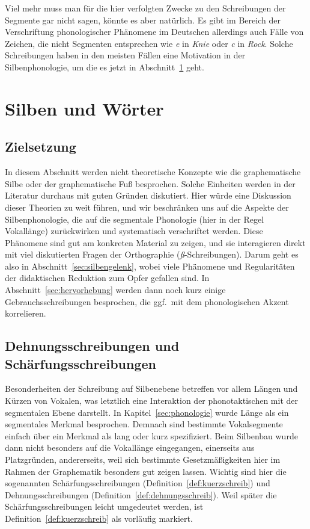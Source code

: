 Viel mehr muss man für die hier verfolgten Zwecke zu den Schreibungen der Segmente gar nicht sagen, könnte es aber natürlich.
Es gibt im Bereich der Verschriftung phonologischer Phänomene im Deutschen allerdings auch Fälle von Zeichen, die nicht Segmenten entsprechen wie \textit{e} in \textit{Knie} oder \textit{c} in \textit{Rock}.
Solche Schreibungen haben in den meisten Fällen eine Motivation in der Silbenphonologie, um die es jetzt in Abschnitt~\ref{sec:silbenschreib} geht.

\section{Silben und Wörter}

\label{sec:silbenschreib}

\subsection{Zielsetzung}

In diesem Abschnitt werden nicht theoretische Konzepte wie die graphematische Silbe oder der graphematische Fuß besprochen.
Solche Einheiten werden in der Literatur durchaus mit guten Gründen diskutiert.
Hier würde eine Diskussion dieser Theorien zu weit führen, und wir beschränken uns auf die Aspekte der Silbenphonologie, die auf die segmentale Phonologie (hier in der Regel Vokallänge) zurückwirken und systematisch verschriftet werden.
Diese Phänomene sind gut am konkreten Material zu zeigen, und sie interagieren direkt mit viel diskutierten Fragen der Orthographie (\zB \textit{ß}-Schreibungen).
Darum geht es also in Abschnitt~\ref{sec:silbengelenk}, wobei viele Phänomene und Regularitäten der didaktischen Reduktion zum Opfer gefallen sind.
In Abschnitt~\ref{sec:hervorhebung} werden dann noch kurz einige Gebrauchsschreibungen besprochen, die ggf.\ mit dem phonologischen Akzent korrelieren.

\subsection{Dehnungsschreibungen und Schärfungsschreibungen}

\label{sec:laengeschreib}

Besonderheiten der Schreibung auf Silbenebene betreffen vor allem Längen und Kürzen von Vokalen, was letztlich eine Interaktion der phonotaktischen mit der segmentalen Ebene darstellt.
In Kapitel~\ref{sec:phonologie} wurde Länge als ein segmentales Merkmal besprochen.
Demnach sind bestimmte Vokalsegmente einfach über ein Merkmal als lang oder kurz spezifiziert.
Beim Silbenbau wurde dann nicht besonders auf die Vokallänge eingegangen, einerseits aus Platzgründen, andererseits, weil sich bestimmte Gesetzmäßigkeiten hier im Rahmen der Graphematik besonders gut zeigen lassen.
Wichtig sind hier die sogenannten Schärfungsschreibungen (Definition~\ref{def:kuerzschreib}) und Dehnungsschreibungen (Definition~\ref{def:dehnungsschreib}).
Weil später die Schärfungsschreibungen leicht umgedeutet werden, ist Definition~\ref{def:kuerzschreib} als vorläufig markiert.

